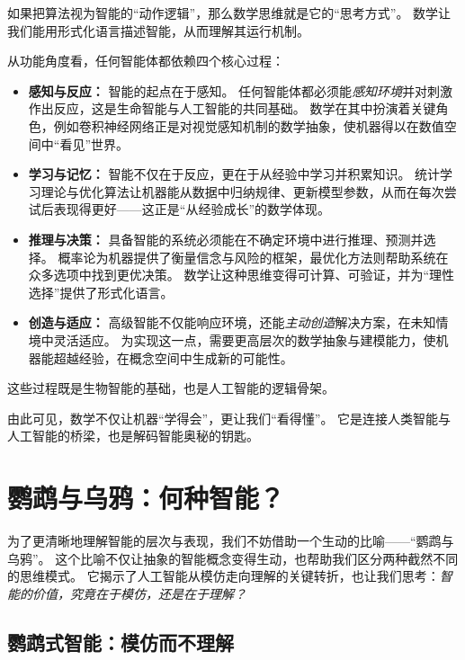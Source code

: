 如果把算法视为智能的“动作逻辑”，那么数学思维就是它的“思考方式”。
数学让我们能用形式化语言描述智能，从而理解其运行机制。

从功能角度看，任何智能体都依赖四个核心过程：
\begin{itemize}
\item \textbf{感知与反应：} 智能的起点在于感知。  
任何智能体都必须能\emph{感知环境}并对刺激作出反应，这是生命智能与人工智能的共同基础。  
数学在其中扮演着关键角色，例如卷积神经网络正是对视觉感知机制的数学抽象，使机器得以在数值空间中“看见”世界。

\item \textbf{学习与记忆：} 智能不仅在于反应，更在于从经验中学习并积累知识。  
统计学习理论与优化算法让机器能从数据中归纳规律、更新模型参数，从而在每次尝试后表现得更好——这正是“从经验成长”的数学体现。

\item \textbf{推理与决策：} 具备智能的系统必须能在不确定环境中进行推理、预测并选择。
概率论为机器提供了衡量信念与风险的框架，最优化方法则帮助系统在众多选项中找到更优决策。
数学让这种思维变得可计算、可验证，并为“理性选择”提供了形式化语言。

\item \textbf{创造与适应：} 高级智能不仅能响应环境，还能\emph{主动创造}解决方案，在未知情境中灵活适应。  
为实现这一点，需要更高层次的数学抽象与建模能力，使机器能超越经验，在概念空间中生成新的可能性。
\end{itemize}

这些过程既是生物智能的基础，也是人工智能的逻辑骨架。

由此可见，数学不仅让机器“学得会”，更让我们“看得懂”。  
它是连接人类智能与人工智能的桥梁，也是解码智能奥秘的钥匙。  


\section{鹦鹉与乌鸦：何种智能？}

为了更清晰地理解智能的层次与表现，我们不妨借助一个生动的比喻——“鹦鹉与乌鸦”。
这个比喻不仅让抽象的智能概念变得生动，也帮助我们区分两种截然不同的思维模式。  
它揭示了人工智能从模仿走向理解的关键转折，也让我们思考：\emph{智能的价值，究竟在于模仿，还是在于理解？}

\subsection{鹦鹉式智能：模仿而不理解}

